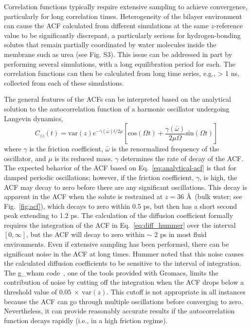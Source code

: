     \par Correlation functions typically require extensive sampling to achieve convergence, particularly for long correlation times. Heterogeneity of the bilayer environment can cause the ACF calculated from different simulations at the same $z$-reference value to be significantly discrepant, a particularly serious for hydrogen-bonding solutes that remain partially coordinated by water molecules inside the membrane such as urea (see Fig. S3). This issue can be addressed in part by performing several simulations, with a long equilibration period for each. The correlation functions can then be calculated from long time series, e.g., > 1 ns, collected from each of these simulations.

  \par The general features of the ACFs can be interpreted based on the analytical solution to the autocorrelation function of a harmonic oscillator undergoing Langevin dynamics,\cite{Tuckerman2010}
\begin{equation}
C_{zz}(t) = \textrm{var}(z) e^{-\gamma(\bar \omega)t/2\mu}[ \textrm{cos}(\Omega t) + \frac{\gamma(\bar \omega)}{2 \mu \Omega } \textrm{sin}(\Omega t)]
\label{eq:analytical-acf}
\end{equation}
   where $\gamma$ is the friction coefficient, $\bar \omega$ is the renormalized frequency of the oscillator, and $\mu$ is its reduced mass. $\gamma$ determines the rate of decay of the ACF. The expected behavior of the ACF based on Eq.~\ref{eq:analytical-acf} is that for damped periodic oscillations; however, if the friction coefficient, $\gamma$, is high, the ACF may decay to zero before there are any significant oscillations. This decay is apparent in the ACF when the solute is restrained at  $z=36$ \AA\ (bulk water; see Fig.~\ref{fig:acf}), which decays to zero within 0.5 ps, but then has a short second peak extending to 1.2 ps. The calculation of the diffusion coefficient formally requires the integration of the ACF in Eq.~\ref{eq:diff_hummer} over the interval $[0, \infty]$, but the ACF will  decay to zero within $\sim$ 2 ps in most fluid environments. Even if extensive sampling has been performed, there can be significant noise in the ACF at long times. Hummer noted that this noise causes the calculated diffusion coefficients to be sensitive to the interval of integration.\cite{Hummer2005} The g\_wham code~\cite{Hub2010}, one of the tools provided with Gromacs, limits the contribution of noise by cutting off the integration when the ACF drops below a threshold value of $0.05\ \times\ \textrm{var}(z)$.  This cutoff is not appropriate in all instances because the ACF can go through multiple oscillations before converging to zero. Nevertheless, it can provide reasonably accurate results if the autocorrelation function decays rapidly (i.e., in a high friction regime).


